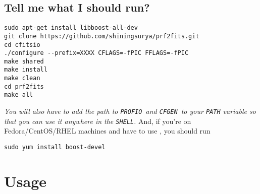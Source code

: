 \documentclass{article}
\newcommand{\prf}{\texttt{PROFIO}\ }
\newcommand{\cfgen}{\texttt{CFGEN}\ }
\begin{document}
\subsection*{\hfill Tell me what I should run?}
\begin{lstlisting}
sudo apt-get install libboost-all-dev 
git clone https://github.com/shiningsurya/prf2fits.git 
cd cfitsio
./configure --prefix=XXXX CFLAGS=-fPIC FFLAGS=-fPIC
make shared 
make install
make clean
cd prf2fits 
make all 
\end{lstlisting}
\par \textit{You will also have to add the path to \prf and \cfgen to your \texttt{PATH} variable so that you can use it anywhere in the \texttt{SHELL}.}
And, if you're on Fedora/CentOS/RHEL machines and have to use , you should run 
\begin{lstlisting}
sudo yum install boost-devel
\end{lstlisting}
\section*{\hfill Usage}
\end{document}
